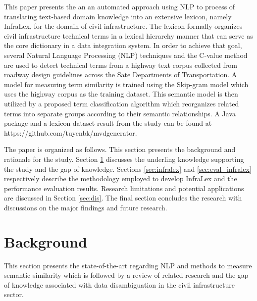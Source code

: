 \documentclass[Journal, BackFigs, DoubleSpace]{ascelike} %
\begin{document}
This paper presents the an an automated approach using NLP to process of translating text-based domain knowledge into an extensive lexicon, namely InfraLex, for the domain of civil infrastructure. The lexicon formally organizes civil infrastructure technical terms in a lexical hierarchy manner that can serve as the core dictionary in a data integration system. In order to achieve that goal, several Natural Language Processing (NLP) techniques and the C-value method \cite{frantzi20} are used to detect technical terms from a highway text corpus collected from roadway design guidelines across the Sate Departments of Transportation. A model for measuring term similarity is trained using the Skip-gram model \cite{mikolov13a} which uses the highway corpus as the training dataset. This semantic model is then utilized by a proposed term classification algorithm which reorganizes related terms into separate groups according to their semantic relationships. A Java package and a lexicon dataset result from the study can be found at https://github.com/tuyenbk/mvdgenerator.
%
\par
The paper is organized as follows. This section presents the background and rationale for the study. Section \ref{sec:litrev} discusses the underling knowledge supporting the study and the gap of knowledge. Sections \ref{sec:infralex} and \ref{sec:eval_infralex} respectively describe the methodology employed to develop InfraLex and the performance evaluation results. Research limitations and potential applications are discussed in Section \ref{sec:dis}. The final section concludes the research with discussions on the major findings and future research.
% 
\section{Background} \label{sec:litrev} %
This section presents the state-of-the-art regarding NLP and methods to measure semantic similarity which is followed by a review of related research and the gap of knowledge associated with data disambiguation in the civil infrastructure sector.
%
\end{document}
